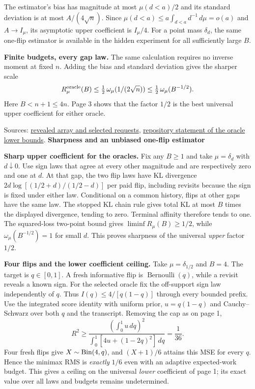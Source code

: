 \documentclass[11pt]{article}
\newcommand{\heading}[1]{{\LARGE\bfseries\color{ink} #1}\par\smallskip}
\newcommand{\src}[2]{\href{https://github.com/davidiach/adaptive-threshold-estimation/blob/97a501383083cc0fa64cb96405444048b8fd4053/#1}{#2}}
\begin{document}
The estimator's bias has magnitude at most $\mu(d<a)/2$ and its standard deviation is at most $A/(4\sqrt n)$. Since $\mu(d<a)\le a\int_{d<a}d^{-1}\,d\mu=o(a)$ and $A\to I_\mu$, its asymptotic upper coefficient is $I_\mu/4$. For a point mass $\delta_d$, the same one-flip estimator is available in the hidden experiment for all sufficiently large $B$.

\textbf{Finite budgets, every gap law.} The same calculation requires no inverse moment at fixed $n$. Adding the bias and standard deviation gives the sharper scale
\[
 R_\mu^{\rm oracle}(B)\le \tfrac12\,\omega_\mu(1/(2\sqrt n))
                          \le \tfrac12\,\omega_\mu(B^{-1/2}).
\]
Here $B<n+1\le 4n$. Page 3 shows that the factor $1/2$ is the best universal upper coefficient for either oracle.

{\small Sources: \src{lean/ThresholdHC/OracleLower/Model.lean}{revealed array and selected requests},
\src{docs/RESULTS.md}{repository statement of the oracle lower bounds}.}
\newpage
\heading{Sharpness and an unbiased one-flip estimator}
\textbf{Sharp upper coefficient for the oracles.} Fix any $B\ge1$ and take $\mu=\delta_d$ with $d\downarrow0$. Use sign laws that agree at every other magnitude and are respectively zero and one at $d$. At that gap, the two flip laws have KL divergence $2d\log[(1/2+d)/(1/2-d)]$ per paid flip, including revisits because the sign is fixed under either law. Conditional on a common history, flips at other gaps have the same law. The stopped KL chain rule gives total KL at most $B$ times the displayed divergence, tending to zero. Terminal affinity therefore tends to one. The squared-loss two-point bound gives $\liminf R_\mu(B)\ge1/2$, while $\omega_\mu(B^{-1/2})=1$ for small $d$. This proves sharpness of the universal \emph{upper} factor $1/2$.

\textbf{Four flips and the lower coefficient ceiling.} Take $\mu=\delta_{1/2}$ and $B=4$. The target is $q\in[0,1]$. A fresh informative flip is $\operatorname{Bernoulli}(q)$, while a revisit reveals a known sign. For the selected oracle fix the off-support sign law independently of $q$. Thus $I(q)\le4/[q(1-q)]$ through every bounded prefix. Use the integrated score identity with uniform prior, $u=q(1-q)$ and Cauchy--Schwarz over both $q$ and the transcript. Removing the cap as on page 1,
\[
 R^2\ge \frac{(\int_0^1 u\,dq)^2}{\int_0^1 [4u+(1-2q)^2]\,dq}=\frac1{36}.
\]
Four fresh flips give $X\sim{\rm Bin}(4,q)$, and $(X+1)/6$ attains this MSE for every $q$. Hence the minimax RMS is \emph{exactly} $1/6$ even with an adaptive expected-work budget. This gives a ceiling on the universal \emph{lower} coefficient of page 1; its exact value over all laws and budgets remains undetermined.
\end{document}
